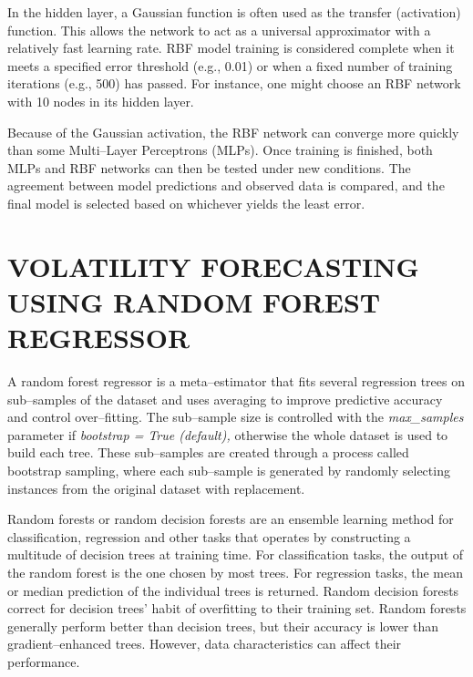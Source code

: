 \documentclass[12pt,a4paper]{report}
\numberwithin{equation}{section}
\begin{document}
In the hidden layer, a Gaussian function is often used as the transfer
(activation) function. This allows the network to act as a universal
approximator with a relatively fast learning rate. RBF model training is
considered complete when it meets a specified error threshold (e.g.,
0.01) or when a fixed number of training iterations (e.g., 500) has
passed. For instance, one might choose an RBF network with 10 nodes in
its hidden layer.

Because of the Gaussian activation, the RBF network can converge more
quickly than some Multi--Layer Perceptrons (MLPs). Once training is
finished, both MLPs and RBF networks can then be tested under new
conditions. The agreement between model predictions and observed data is
compared, and the final model is selected based on whichever yields the
least error.

\hypertarget{volatility--forecasting--using--random--forest--regressor}{%
\section{\texorpdfstring{\textbf{VOLATILITY FORECASTING USING RANDOM
FOREST
REGRESSOR}}{VOLATILITY FORECASTING USING RANDOM FOREST REGRESSOR}}\label{volatility--forecasting--using--random--forest--regressor}}

A random forest regressor is a meta--estimator that fits several
regression trees on sub--samples of the dataset and uses averaging to
improve predictive accuracy and control over--fitting. The sub--sample
size is controlled with the \emph{max\_samples} parameter if
\emph{bootstrap = True (default),} otherwise the whole dataset is used
to build each tree. These sub--samples are created through a process
called bootstrap sampling, where each sub--sample is generated by
randomly selecting instances from the original dataset with replacement.

Random forests or random decision forests are an ensemble learning
method for classification, regression and other tasks that operates by
constructing a multitude of decision trees at training time. For
classification tasks, the output of the random forest is the one chosen
by most trees. For regression tasks, the mean or median prediction of
the individual trees is returned. Random decision forests correct for
decision trees' habit of overfitting to their training set. Random
forests generally perform better than decision trees, but their accuracy
is lower than gradient--enhanced trees. However, data characteristics can
affect their performance.
\end{document}
